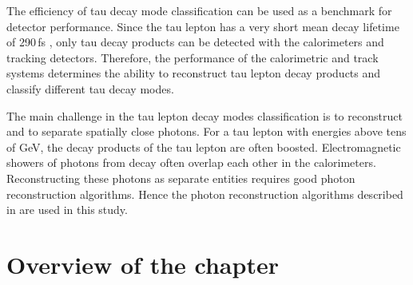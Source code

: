 The efficiency of tau decay mode classification can be used as a benchmark for detector performance. Since the tau lepton has a very short mean decay lifetime of 290\,fs \cite{Abreu:1991jn}, only tau decay products can be detected with the calorimeters and tracking detectors. Therefore, the performance of the calorimetric and track systems determines the ability to reconstruct tau lepton decay products and classify different tau decay modes.

The main challenge in the tau lepton decay modes  classification is to reconstruct and to separate spatially close photons. For a tau lepton with energies above tens of GeV, the decay products of the tau lepton are often boosted.  Electromagnetic showers of photons from \Ppizero decay often overlap each other in the calorimeters.  Reconstructing these photons as separate entities requires good photon reconstruction algorithms. Hence the photon reconstruction algorithms described in  are used in this study.







%



\section{Overview of the chapter}

